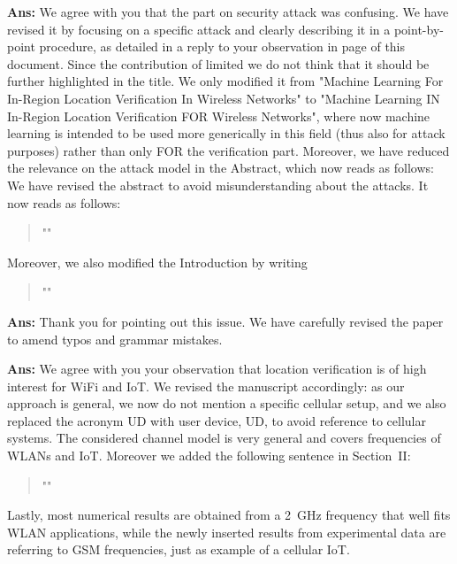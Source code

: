\documentclass[draftcls,onecolumn,12pt]{IEEEtran}
\newcounter{revc}
\newcommand{\revp}[1]{\zref[revcontent]{#1}}
\begin{document}
{\bf Ans:} We agree with you that the part on security attack was confusing. We have revised it by focusing on a specific attack and clearly describing it in a point-by-point procedure, as detailed in a reply to your observation in page \pageref{MLattackissue} of this document. Since the contribution of limited we do not think that it should be further highlighted in the title. We only modified it from "Machine Learning For In-Region Location Verification In Wireless Networks" to "Machine Learning IN In-Region Location Verification FOR Wireless Networks", where now machine learning is intended to be used more generically in this field (thus also for attack purposes) rather than only FOR the verification part. Moreover, we have reduced the relevance on the attack model in the Abstract, which now reads as follows:
We have revised the abstract to avoid misunderstanding about the attacks. It now reads as follows:
\begin{quote}
    "\revp{rev14}"
\end{quote}
Moreover, we also modified the Introduction by writing
\begin{quote}
    "\revp{rev14b}"
\end{quote}

\vspace{5mm} %
\begin{framed}
\end{framed}

{\bf Ans:} Thank you for pointing out this issue. We have carefully revised the paper to amend typos and grammar mistakes.

\vspace{5mm} %
\begin{framed}
\end{framed}

{\bf Ans:} We agree with you your observation that location verification is of high interest for WiFi and IoT. We revised the manuscript accordingly: as our approach is general, we now do not mention a specific cellular setup, and we also replaced the acronym UD with user device, UD, to avoid reference to cellular systems. The considered channel model is very general and covers frequencies of WLANs and IoT. Moreover we added the following sentence in Section~II:
\begin{quote}
    "\revp{WiFi2}"
\end{quote}
Lastly, most numerical results are obtained from a 2~GHz frequency that well fits WLAN applications, while the newly inserted results from experimental data are referring to GSM frequencies, just as example of a cellular IoT.
\end{document}
